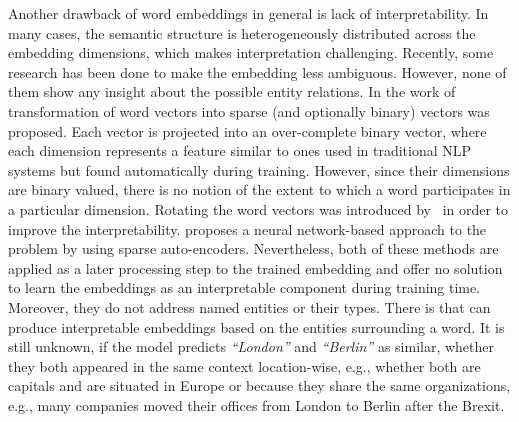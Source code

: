 Another drawback of word embeddings in general is lack of interpretability. In many cases, the semantic structure is heterogeneously distributed across the embedding dimensions, which makes interpretation challenging. Recently, some research has been done to make the embedding less ambiguous. However, none of them show any insight about the possible entity relations. In the work of~ transformation of word vectors into sparse (and optionally binary) vectors was proposed. Each vector is projected into an over-complete binary vector, where each dimension represents a feature similar to ones used in traditional NLP systems but found automatically during training. However, since their dimensions are binary valued, there is no notion of the extent to which a word participates in a particular dimension. Rotating the word vectors was introduced by~ in order to improve the interpretability.   proposes a neural network-based approach to the problem by using sparse auto-encoders. Nevertheless, both of these methods are applied as a later processing step to the trained embedding and offer no solution to learn the embeddings as an interpretable component during training time. Moreover, they do not address named entities or their types. There is  that can produce interpretable embeddings based on the entities surrounding a word. It is still unknown, if the model predicts \emph{``London''} and \emph{``Berlin''} as similar, whether they both appeared in the same context location-wise, e.g., whether both are capitals and are situated in Europe or because they share the same organizations, e.g., many companies moved their offices from London to Berlin after the Brexit. 

%

